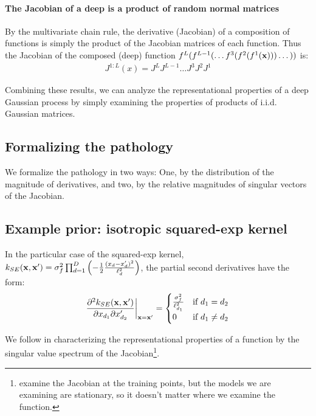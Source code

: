 \documentclass{article}
\newcommand{\fdeep}{f^{1:L}}
\begin{document}
\paragraph{The Jacobian of a deep \gp{} is a product of random normal matrices}
By the multivariate chain rule, the derivative (Jacobian) of a composition of functions is simply the product of the Jacobian matrices of each function.  
%
Thus the Jacobian of the composed (deep) function $f^L(f^{L-1}(\dots f^3(f^2(f^1({\bf{x}})))\dots))$ is:
%
\begin{align}
J^{1:L}(x) 
= J^L J^{L-1} \dots J^3 J^2 J^1
\end{align}

Combining these results, we can analyze the representational properties of a deep Gaussian process by simply examining the properties of products of i.i.d. Gaussian matrices.

\subsection{Formalizing the pathology}

We formalize the pathology in two ways:  One, by the distribution of the magnitude of derivatives, and two, by the relative magnitudes of singular vectors of the Jacobian.

\subsection{Example prior: isotropic squared-exp kernel}

In the particular case of the squared-exp kernel, $k_{SE}({\bf{x}}, {\bf{x}}') = \sigma^2_f \prod_{d=1}^D \left(-\frac{1}{2} \frac{(x_d - x_d')^2}{\ell_d^2} \right)$, the partial second derivatives have the form:
\begin{align}
\frac{\partial^2 k_{SE}({\bf{x}}, {\bf{x}}')}{\partial x_{d_1} \partial x_{d_2}'} \bigg|_{{\bf{x}}={\bf{x}}'}
= \begin{cases} 
\frac{\sigma^2_f}{\ell_{d_1}^2} & \mbox{if } d_1 = d_2 \\ 
0 & \mbox{if } d_1 \neq d_2 \end{cases}
\end{align}

We follow \cite{rifai2011contractive} in characterizing the representational properties of a function by the singular value spectrum of the Jacobian\footnote{ \cite{rifai2011contractive} examine the Jacobian at the training points, but the models we are examining are stationary, so it doesn't matter where we examine the function.}.  
\end{document}
